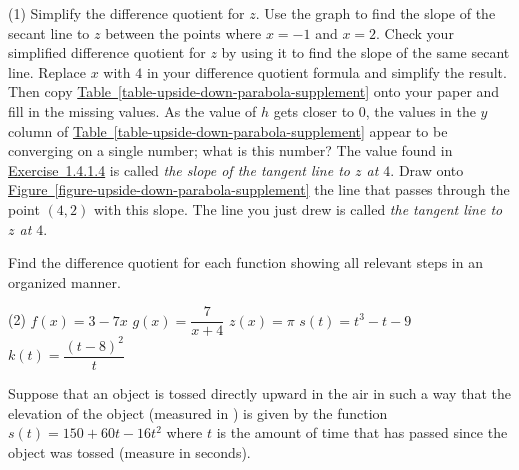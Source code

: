 \documentclass[12pt,]{book}
\theoremstyle{plain}
\theoremstyle{definition}
\theoremstyle{definition}
\theoremstyle{definition}
\theoremstyle{definition}
\theoremstyle{definition}
\numberwithin{equation}{section}
\newcommand{\fe}[2]{#1\mathopen{}\left(#2\right)\mathclose{}}
\newcommand{\point}[2]{\left(#1,#2\right)}
\begin{document}
\begin{exercisegroup}(1)
\exercise[1.]\hypertarget{exercise-30}{}Simplify the difference quotient for \(z\).%
\exercise[2.]\hypertarget{exercise-31}{}Use the graph to find the slope of the secant line to \(z\) between the points where \(x=-1\) and \(x=2\).  Check your simplified difference quotient for \(z\) by using it to find the slope of the same secant line.%
\exercise[3.]\hypertarget{exercise-32}{}Replace \(x\) with \(4\) in your difference quotient formula and simplify the result.  Then copy \hyperref[table-upside-down-parabola-supplement]{Table~\ref{table-upside-down-parabola-supplement}} onto your paper and fill in the missing values.%
\exercise[4.]\hypertarget{exercise-upside-down-parabola-slope}{}As the value of \(h\) gets closer to \(0\), the values in the \(y\) column of \hyperref[table-upside-down-parabola-supplement]{Table~\ref{table-upside-down-parabola-supplement}} appear to be converging on a single number; what is this number?%
\exercise[5.]\hypertarget{exercise-34}{}The value found in \hyperlink{exercise-upside-down-parabola-slope}{Exercise~1.4.1.4} is called \emph{the slope of the tangent line to \(z\) at \(4\)}.  Draw onto \hyperref[figure-upside-down-parabola-supplement]{Figure~\ref{figure-upside-down-parabola-supplement}} the line that passes through the point \(\point{4}{2}\) with this slope.  The line you just drew is called \emph{the tangent line to \(z\) at \(4\)}.%
\end{exercisegroup}
\par\smallskip\noindent
\hypertarget{exercisegroup-10}{}\par\noindent Find the difference quotient for each function showing all relevant steps in an organized manner.%
\begin{exercisegroup}(2)
\exercise[6.]\hypertarget{exercise-35}{}\(\fe{f}{x}=3-7x\)%
\exercise[7.]\hypertarget{exercise-36}{}\(\fe{g}{x}=\dfrac{7}{x+4}\)%
\exercise[8.]\hypertarget{exercise-37}{}\(\fe{z}{x}=\pi\)%
\exercise[9.]\hypertarget{exercise-38}{}\(\fe{s}{t}=t^3-t-9\)%
\exercise[10.]\hypertarget{exercise-39}{}\(\fe{k}{t}=\dfrac{(t-8)^2}{t}\)%
\end{exercisegroup}
\par\smallskip\noindent
\hypertarget{exercisegroup-11}{}\par\noindent Suppose that an object is tossed directly upward in the air in such a way that the elevation of the object (measured in \si{\foot}) is given by the function \(\fe{s}{t}=150+60t-16t^2\) where \(t\) is the amount of time that has passed since the object was tossed (measure in seconds).%
\end{document}
